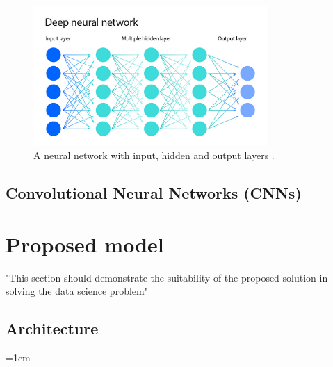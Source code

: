 \documentclass[12pt]{report}
\begin{document}
\begin{figure}[H]
    \centering
    \includegraphics[width=0.8\textwidth]{Proposal/NeuralNetworkCropped.png}
    \caption{A neural network with input, hidden and output layers \autocite{ibmWhatNeuralNetwork2021}.\label{fig:NeuralNetwork}}
\end{figure}


\section{Convolutional Neural Networks (CNNs)}


\chapter{Proposed model}
"This section should demonstrate the suitability of
the proposed solution in solving the data science problem"

\section{Architecture}\label{sec:ModelArchitecture}





\emergencystretch=1em
\printbibliography
\end{document}
